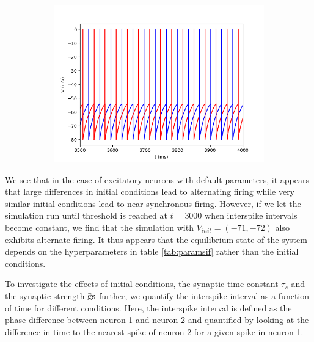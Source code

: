 \documentclass{article}
\begin{document}
\begin{figure}[h]
\begin{subfigure}[t]{0.30\linewidth}
		\label{fig:V71e}	
	\end{subfigure}%
	\hspace{0.03\linewidth}
	\begin{subfigure}[t]{0.30\linewidth}
		\centering
		\includegraphics[width = 1.0\linewidth, trim={0 0 0 0}, clip=true]{V_70_71e_late.png}
		\label{fig:V71e_late}	
	\end{subfigure}%
\label{fig:IFe}
\end{figure}

We see that in the case of excitatory neurons with default parameters, it appears that large differences in initial conditions lead to alternating firing while very similar initial conditions lead to near-synchronous firing. However, if we let the simulation run until threshold is reached at $t=3000$ when interspike intervals become constant, we find that the simulation with $V_{init} = (-71, -72)$ also exhibits alternate firing. It thus appears that the equilibrium state of the system depends on the hyperparameters in table \ref{tab:paramsif} rather than the initial conditions.

To investigate the effects of initial conditions, the synaptic time constant $\tau_s$ and the synaptic strength $\rm \bar gs$ further, we quantify the interspike interval as a function of time for different conditions. Here, the interspike interval is defined as the phase difference between neuron 1 and neuron 2 and quantified by looking at the difference in time to the nearest spike of neuron 2 for a given spike in neuron 1.
\end{document}
